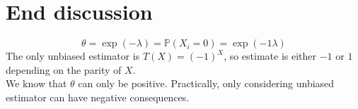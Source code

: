 \documentclass[11pt]{book}
\begin{document}
\section{End discussion}

\[ 
  \theta = \exp(-\lambda) = \mathbb{P}(X_i = 0) = \exp(-1 \lambda)
\]
The only unbiased estimator is $T(X) = (-1)^X$, so estimate is either $-1$ or $1$ depending on the parity of $X$. \\ 

\noindent We know that $\theta$ can only be positive. Practically, only considering unbiased estimator can have negative consequences.
\end{document}
